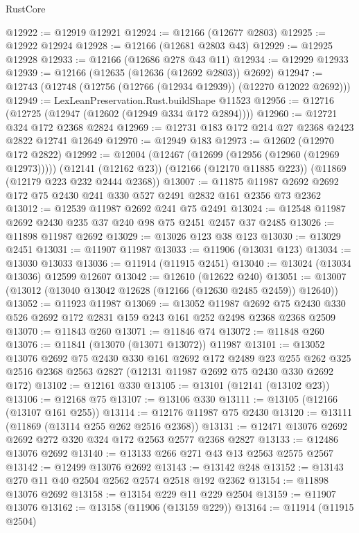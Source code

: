 \begin{lexlean}{RustCore}
\begin{coremodule}
@12922 := @12919 @12921
@12924 := @12166 (@12677 @2803)
@12925 := @12922 @12924
@12928 := @12166 (@12681 @2803 @43)
@12929 := @12925 @12928
@12933 := @12166 (@12686 @278 @43 @11)
@12934 := @12929 @12933
@12939 := @12166 (@12635 (@12636 (@12692 @2803)) @2692)
@12947 := @12743 (@12748 (@12756 (@12766 (@12934 @12939)) (@12270 @12022 @2692)))
@12949 := LexLeanPreservation.Rust.buildShape @11523
@12956 := @12716 (@12725 (@12947 (@12602 (@12949 @334 @172 @2894))))
@12960 := @12721 @324 @172 @2368 @2824
@12969 := @12731 @183 @172 @214 @27 @2368 @2423 @2822 @12741 @12649
@12970 := @12949 @183
@12973 := @12602 (@12970 @172 @2822)
@12992 := @12004
    (@12467 (@12699 (@12956 (@12960 (@12969 @12973)))))
    (@12141 (@12162 @23))
    (@12166 (@12170 @11885 @223))
    (@11869 (@12179 @223 @232 @2444 @2368))
@13007 := @11875 @11987 @2692 @2692 @172 @75 @2430 @241 @330 @527 @2491 @2832 @161 @2356 @73 @2362
@13012 := @12539 @11987 @2692 @241 @75 @2491
@13024 := @12548 @11987 @2692 @2430 @235 @37 @240 @98 @75 @2451 @2457 @37 @2485
@13026 := @11898 @11987 @2692
@13029 := @13026 @123 @38 @123
@13030 := @13029 @2451
@13031 := @11907 @11987
@13033 := @11906 (@13031 @123)
@13034 := @13030 @13033
@13036 := @11914 (@11915 @2451)
@13040 := @13024 (@13034 @13036) @12599 @12607
@13042 := @12610 (@12622 @240)
@13051 := @13007 (@13012 (@13040 @13042 @12628 (@12166 (@12630 @2485 @2459)) @12640))
@13052 := @11923 @11987
@13069 := @13052
    @11987
    @2692
    @75
    @2430
    @330
    @526
    @2692
    @172
    @2831
    @159
    @243
    @161
    @252
    @2498
    @2368
    @2368
    @2509
@13070 := @11843 @260
@13071 := @11846 @74
@13072 := @11848 @260
@13076 := @11841 (@13070 (@13071 @13072)) @11987
@13101 := @13052
    @13076
    @2692
    @75
    @2430
    @330
    @161
    @2692
    @172
    @2489
    @23
    @255
    @262
    @325
    @2516
    @2368
    @2563
    @2827
    (@12131 @11987 @2692 @75 @2430 @330 @2692 @172)
@13102 := @12161 @330
@13105 := @13101 (@12141 (@13102 @23))
@13106 := @12168 @75
@13107 := @13106 @330
@13111 := @13105 (@12166 (@13107 @161 @255))
@13114 := @12176 @11987 @75 @2430
@13120 := @13111 (@11869 (@13114 @255 @262 @2516 @2368))
@13131 := @12471 @13076 @2692 @2692 @272 @320 @324 @172 @2563 @2577 @2368 @2827
@13133 := @12486 @13076 @2692
@13140 := @13133 @266 @271 @43 @13 @2563 @2575 @2567
@13142 := @12499 @13076 @2692
@13143 := @13142 @248
@13152 := @13143 @270 @11 @40 @2504 @2562 @2574 @2518 @192 @2362
@13154 := @11898 @13076 @2692
@13158 := @13154 @229 @11 @229 @2504
@13159 := @11907 @13076
@13162 := @13158 (@11906 (@13159 @229))
@13164 := @11914 (@11915 @2504)

\end{coremodule}
\end{lexlean}

